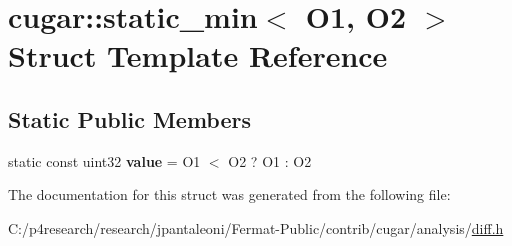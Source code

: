 \hypertarget{structcugar_1_1static__min}{}\section{cugar\+:\+:static\+\_\+min$<$ O1, O2 $>$ Struct Template Reference}
\label{structcugar_1_1static__min}
\subsection*{Static Public Members}
\begin{DoxyCompactItemize}
\item 
\mbox{\label{structcugar_1_1static__min_a36109c21d643af833cb8b0f08b2875f5}} 
static const uint32 {\bfseries value} = O1 $<$ O2 ? O1 \+: O2
\end{DoxyCompactItemize}


The documentation for this struct was generated from the following file\+:\begin{DoxyCompactItemize}
\item 
C\+:/p4research/research/jpantaleoni/\+Fermat-\/\+Public/contrib/cugar/analysis/\hyperlink{diff_8h}{diff.\+h}\end{DoxyCompactItemize}
